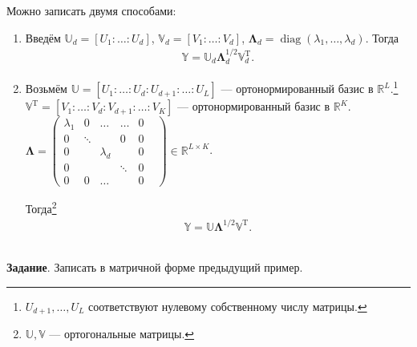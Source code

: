 \documentclass[specialist, 12pt,
subf, %
href, colorlinks=true,
substylefile = spbu.rtx,
]{disser}
\DeclareMathOperator{\diag}{diag}
\begin{document}
Можно записать двумя способами:
\begin{enumerate}
	\item Введём $\mathbb{U}_d = [U_1: \ldots: U_d]$, $\mathbb{V}_d = [V_1: \ldots: V_d]$, $\bm\Lambda_d = \diag(\lambda_1, \ldots, \lambda_d)$. Тогда
	\begin{gather*}
	\mathbb{Y} = \mathbb{U}_d\bm\Lambda_d^{1/2}\mathbb{V}_d^{\mathrm{T}}.
	\end{gather*}
	\item Возьмём $\mathbb{U} = [U_1: \ldots: U_d: U_{d+1}: \ldots: U_L]$ --- ортонормированный базис в $\mathbb{R}^L$.\footnote{$U_{d+1}, \ldots, U_L$ соответствуют нулевому собственному числу матрицы.}\\
	$\mathbb{V}^\mathrm{T} = [V_1: \ldots: V_d: V_{d+1}: \ldots: V_K]$ --- ортонормированный базис в $\mathbb{R}^K$.\\
	$\bm\Lambda = \begin{pmatrix}
	\lambda_1 & 0 & \ldots & \ldots & 0\\
	0 & \ddots & & 0 & 0\\
	0 & & \lambda_d & & 0&\\
	0 & & & \ddots & 0\\
	0 & 0 & \ldots & & 0 &
	\end{pmatrix} \in \mathbb{R}^{L \times K}$.

Тогда\footnote{$\mathbb{U}, \mathbb{V}$ --- ортогональные матрицы.}
	\begin{gather*}
	\mathbb{Y} = \mathbb{U} \bm\Lambda^{1/2} \mathbb{V}^{\mathrm{T}}.
	\end{gather*}
	~\\
\end{enumerate}

\textbf{Задание}. Записать в матричной форме предыдущий пример.
\end{document}
